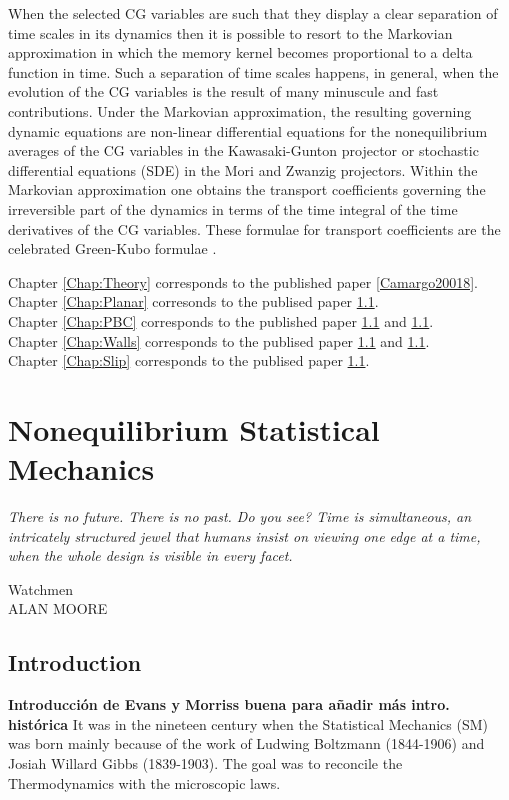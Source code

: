 \documentclass[a4paper,openright,12pt]{book}
\newcommand{\Note}[1]{{\bf \color{red}#1}}    %
\begin{document}
When the  selected CG  variables are  such that  they display  a clear
separation  of time  scales in  its dynamics  then it  is possible  to
resort  to the  Markovian  approximation in  which  the memory  kernel
becomes proportional to  a delta function in time.   Such a separation
of  time scales  happens, in  general, when  the evolution  of the  CG
variables  is the  result of  many minuscule  and fast  contributions.
Under  the Markovian  approximation, the  resulting governing  dynamic
equations    are   non-linear    differential   equations    for   the
nonequilibrium averages  of the  CG variables in  the Kawasaki-Gunton
projector or stochastic  differential equations (SDE) in  the Mori and
Zwanzig projectors.   Within the  Markovian approximation  one obtains
the  transport coefficients  governing  the irreversible  part of  the
dynamics in terms of the time  integral of the time derivatives of the
CG  variables.   These formulae  for  transport  coefficients are  the
celebrated Green-Kubo formulae \cite{Green1952,Kubo1957}.


Chapter \ref{Chap:Theory} corresponds to the published paper \ref{Camargo20018}.\\
Chapter \ref{Chap:Planar} corresonds to the publised paper \ref{}.\\
Chapter \ref{Chap:PBC} corresponds to the published paper \ref{} and \ref{}.\\
Chapter \ref{Chap:Walls} corresponds to the publised paper \ref{} and \ref{}.\\
Chapter \ref{Chap:Slip} corresponds to the publised paper \ref{}.\\


\chapter{Nonequilibrium Statistical Mechanics}
\label{Chap:NESM}
\epigraph{\textit{There is no future. There is no past. Do you see? Time is simultaneous, an intricately structured jewel that humans insist on viewing one edge at a time, when the whole design is visible in every facet.}}{Watchmen \\ ALAN MOORE} 

\section{Introduction}
\Note{Introducción de Evans y Morriss buena para añadir más intro. histórica}
It was in the nineteen century when the Statistical Mechanics (SM) was born mainly because of the work of Ludwing Boltzmann (1844-1906) and Josiah Willard Gibbs (1839-1903). The goal was to reconcile the Thermodynamics with the microscopic laws. 
\end{document}
